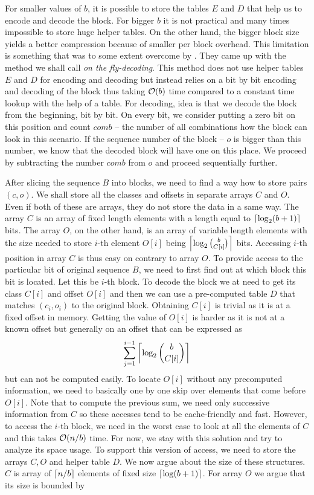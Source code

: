 For smaller values of $b$, it is possible to store the tables $E$ and $D$ that help us
to encode and decode the block. For bigger $b$ it is not practical and many times
impossible to store huge helper tables. On the other hand, the bigger block size yields a
better compression because of smaller per block overhead. This limitation is something that
was to some extent overcome by \cite{navarro2012fast}. They came up with the method we shall
call \textit{on the fly-decoding}. This method does not use helper tables $E$ and $D$ for
encoding and decoding but instead relies on a bit by bit encoding and decoding of the block
thus taking $\mathcal{O}(b)$ time compared to a constant time lookup with the help of a table.
For decoding, idea is that we decode the block from the beginning, bit by bit. On every bit,
we consider putting a zero bit on this position and count $comb$ -- the number of all
combinations how the block can look in this scenario. If the sequence number of the block --
$o$ is bigger than this number, we know that the decoded block will have one on this place.
We proceed by subtracting the number $comb$ from $o$ and proceed sequentially further.

After slicing the sequence $B$ into blocks, we need to find a way how to store pairs $(c, o)$.
We shall store all the classes and offsets in separate arrays $C$ and $O$. Even if both of these
are arrays, they do not store the data in a same way. The array $C$ is an array of fixed length
elements with a length equal to $\left\lceil \log_2(b+1) \right\rceil$ bits. The array $O$, on the other hand, is
an array of variable length elements with the size needed to store $i$-th element $O[i]$ being
$\left\lceil \log_2{b\choose C[i]} \right\rceil$ bits. Accessing $i$-th position in array $C$ is thus easy on
contrary to array $O$. To provide access to the particular bit of original sequence $B$, we
need to first find out at which block this bit is located. Let this be $i$-th block. To decode
the block we at need to get its class $C[i]$ and offset $O[i]$ and then we can use a pre-computed
table $D$ that matches $(c_i, o_i)$ to the original block. Obtaining $C[i]$ is trivial as it is at
a fixed offset in memory. Getting the value of $O[i]$ is harder as it is not at a known offset but
generally on an offset that can be expressed as $$\sum_{j=1}^{i-1} \left\lceil \log_2{b\choose C[i]} \right\rceil$$ but
can not be computed easily. To locate $O[i]$ without any precomputed information, we need to basically
one by one skip over elements that come before $O[i]$. Note that to compute the previous sum, we need
only successive information from $C$ so these accesses tend to be cache-friendly and fast. However,
to access the $i$-th block, we need in the worst case to look at all the elements of $C$ and this
takes $\mathcal{O}(n/b)$ time. For now, we stay with this solution and try to analyze its space usage. To
support this version of access, we need to store the arrays $C, O$ and helper table $D$. We now
argue about the size of these structures. $C$ is array of $\left\lceil n/b \right\rceil$ elements of fixed size
$\left\lceil \log(b+1) \right\rceil$. For array $O$ we argue that its size is bounded by

